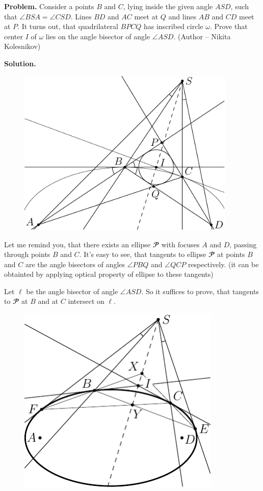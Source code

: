 \documentclass[14pt]{extarticle}
\renewcommand{\P}{\mathbfcal{P}}
\begin{document}
\textbf{Problem.} Consider a points \(B\) and \(C\), lying inside the given 
angle \(ASD\), such that \(\angle BSA = \angle CSD\). Lines \(BD\) and 
\(AC\) meet at \(Q\) and lines \(AB\) and \(CD\) meet at \(P\). 
It turns out, that quadrilateral \(BPCQ\) has inscribed circle 
\(\omega\). Prove that center \(I\) of \(\omega\) 
lies on the angle bisector of angle \(\angle ASD\). 
(Author -- Nikita Kolesnikov) 

\textbf{Solution.}

\begin{figure}[H]
    \centering
    \includegraphics[height=8cm]{fig.pdf}
\end{figure}

Let me remind you, that there exists an ellipse \(\P\) with focuses 
\(A\) and \(D\), passing through points \(B\) and \(C\). It's easy 
to see, that tangents to ellipse \(\P\) at points \(B\) and \(C\) are the 
angle bisectors of angles \(\angle PBQ\) and \(\angle QCP\) respectively.
(it can be obtainted by applying optical property of ellipse to these 
tangents)

Let \(\ell\) be the angle bisector of angle \(\angle ASD\). So it suffices to prove, that tangents to \(\P\) at \(B\) and at \(C\) 
intersect on \(\ell\).
\begin{figure}[H]
    \centering
    \includegraphics[height=9cm]{fig2.pdf}
\end{figure}
\end{document}
